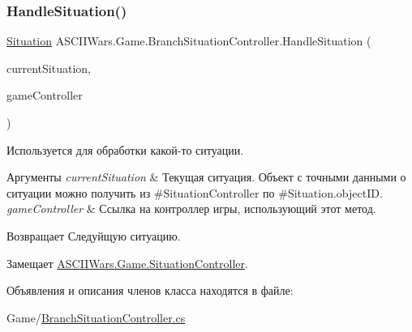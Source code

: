 \subsubsection{\texorpdfstring{Handle\+Situation()}{HandleSituation()}}
{\footnotesize\ttfamily \hyperlink{class_a_s_c_i_i_wars_1_1_game_1_1_situation}{Situation} A\+S\+C\+I\+I\+Wars.\+Game.\+Branch\+Situation\+Controller.\+Handle\+Situation (\begin{DoxyParamCaption}\item[{\hyperlink{class_a_s_c_i_i_wars_1_1_game_1_1_situation}{Situation}}]{current\+Situation,  }\item[{\hyperlink{class_a_s_c_i_i_wars_1_1_game_1_1_game_controller}{Game\+Controller}}]{game\+Controller }\end{DoxyParamCaption})\hspace{0.3cm}{\ttfamily [inline]}}



Используется для обработки какой-\/то ситуации. 


\begin{DoxyParams}{Аргументы}
{\em current\+Situation} & Текущая ситуация. Объект с точными данными о ситуации можно получить из \#\+Situation\+Controller по \#\+Situation.\+object\+ID. \\
\hline
{\em game\+Controller} & Ссылка на контроллер игры, использующий этот метод. \\
\hline
\end{DoxyParams}
\begin{DoxyReturn}{Возвращает}
Следуйщую ситуацию. 
\end{DoxyReturn}


Замещает \hyperlink{interface_a_s_c_i_i_wars_1_1_game_1_1_situation_controller_a2cf0359dfc1683beb63f0dfed1c372e6}{A\+S\+C\+I\+I\+Wars.\+Game.\+Situation\+Controller}.



Объявления и описания членов класса находятся в файле\+:\begin{DoxyCompactItemize}
\item 
Game/\hyperlink{_branch_situation_controller_8cs}{Branch\+Situation\+Controller.\+cs}\end{DoxyCompactItemize}
